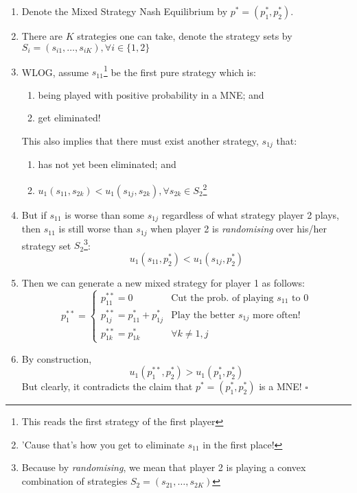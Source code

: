 \documentclass{tufte-handout}
\begin{document}
\begin{enumerate}
    
    \item Denote the Mixed Strategy Nash Equilibrium by $p^* = (p^*_1, p^*_2)$.
    
    \item There are $K$ strategies one can take, denote the strategy sets by $S_i = (s_{i1}, \dots, s_{iK}), \forall i \in \{1,2\}$
    
    \item WLOG, assume $s_{11}$\footnote{This reads the first strategy of the first player} be the first pure strategy which is:
        \begin{enumerate}
            \item being played with positive probability in a MNE; and
            \item get eliminated!
        \end{enumerate}
        This also implies that there must exist another strategy, $s_{1j}$ that:
        \begin{enumerate}
            \item has not yet been eliminated; and
            \item $u_1(s_{11}, s_{2k}) < u_1(s_{1j}, s_{2k}), \forall s_{2k} \in S_2$\footnote{'Cause that's how you get to eliminate $s_{11}$ in the first place!}
        \end{enumerate}
   
    \item But if $s_{11}$ is worse than some $s_{1j}$ regardless of what strategy player 2 plays, then $s_{11}$ is still worse than $s_{1j}$ when player 2 is \textit{randomising} over his/her strategy set $S_2$\footnote{Because by \textit{randomising}, we mean that player 2 is playing a convex combination of strategies $S_2 = (s_{21}, \dots, s_{2K})$}: $$u_1(s_{11}, p^*_2) < u_1(s_{1j}, p^*_2)$$
   
    \item Then we can generate a new mixed strategy for player 1 as follows:
    \begin{equation*}
        p^{**}_1 =
        \begin{cases}
            p^{**}_{11} = 0 & \text{Cut the prob. of playing } s_{11}   \text{ to } 0\\
            p^{**}_{1j} = p^{*}_{11} + p^{*}_{1j} & \text{Play the better } s_{1j} \text{ more often!}\\
            p^{**}_{1k} = p^{*}_{1k} & \forall k \neq {1, j} 
        \end{cases}       
    \end{equation*}
    
    \item By construction, $$u_1(p^{**}_{1}, p^{*}_{2}) > u_1(p^{*}_{1}, p^{*}_{2})$$ 
    But clearly, it contradicts the claim that $p^* = (p^*_1, p^*_2)$ is a MNE! $\square$
\end{enumerate}

%
%
\end{document}
